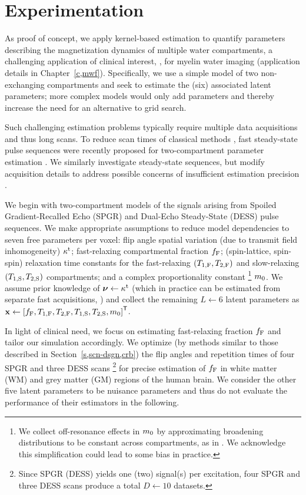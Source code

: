 \section{Experimentation}
\label{s,krr,exp}

As proof of concept, 
we apply kernel-based estimation 
to quantify parameters describing 
the magnetization dynamics of multiple water compartments,
a challenging application of clinical interest,
\eg, for myelin water imaging 
(application details in Chapter~\ref{c,mwf}).
Specifically,
we use a simple model of two non-exchanging compartments
and seek to estimate the (six) associated latent parameters;
more complex models would only add parameters
and thereby increase the need for an alternative to grid search.

Such challenging estimation problems
typically require multiple data acquisitions
and thus long scans.
To reduce scan times
of classical methods
\cite{mackay:94:ivv},
fast steady-state pulse sequences
were recently proposed 
for two-compartment parameter estimation
\cite{deoni:08:gmt, deoni:11:com}.
We similarly investigate steady-state sequences,
but modify acquisition details
to address possible concerns
of insufficient estimation precision
\cite{lankford:13:oti}.

We begin with two-compartment models
of the signals arising from
Spoiled Gradient-Recalled Echo (SPGR)
\cite{zur:91:sot}
and Dual-Echo Steady-State (DESS) 
\cite{bruder:88:ans}
pulse sequences.
We make appropriate assumptions 
to reduce model dependencies
to seven free parameters per voxel:
flip angle spatial variation 
(due to transmit field inhomogeneity) $\kappa^{\mathrm{t}}$;
fast-relaxing compartmental fraction $f_{\mathrm{F}}$;
(spin-lattice, spin-spin) relaxation time constants 
for the fast-relaxing $\paren{\tf{1},\tf{2}}$
and slow-relaxing $\paren{\ts{1},\ts{2}}$ compartments;
and a complex proportionality constant
\footnote{We collect off-resonance effects in $m_0$
by approximating broadening distributions
to be constant across compartments,
as in \cite{deoni:08:gmt, deoni:11:com}.
We acknowledge this simplification
could lead to some bias in practice.}
$m_0$.
We assume prior knowledge of $\boldsymbol{\nu} \gets \kappa^{\mathrm{t}}$ 
(which in practice can be estimated
from separate fast acquisitions, 
\eg \cite{sacolick:10:bmb})
and collect the remaining $L \gets 6$ latent parameters as
$\bmx \gets \brac{\ff,\tf{1},\tf{2},\ts{1},\ts{2},\mzero}\tpose$.

In light of clinical need,
we focus on estimating fast-relaxing fraction $f_{\mathrm{F}}$
and tailor our simulation accordingly.
We optimize 
(by methods similar to those described in Section~\ref{s,scn-dsgn,crb})
the flip angles and repetition times
of four SPGR and three DESS scans
\footnote{Since SPGR (DESS) yields one (two) signal(s) per excitation,
four SPGR and three DESS scans produce a total $D \gets 10$ datasets.}
for precise estimation of $f_{\mathrm{F}}$ 
in white matter (WM) 
and grey matter (GM) regions 
of the human brain.
We consider the other five latent parameters
to be nuisance parameters
and thus do not evaluate the performance of their estimators
in the following.

